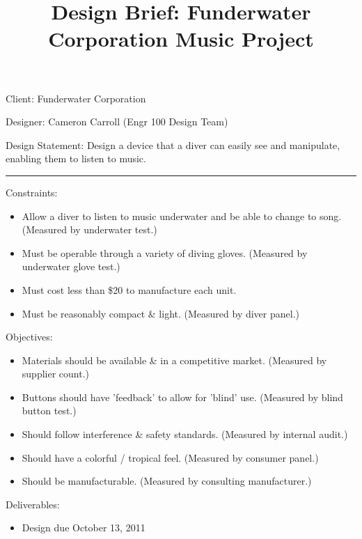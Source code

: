 
\setlength{\topmargin}{-.7in}
\setlength{\leftmargin}{-.7in}
\setlength{\textheight}{9in}
\setlength{\oddsidemargin}{0in}
\setlength{\textwidth}{6.25in}



\title{Design Brief: Funderwater Corporation Music Project}
\maketitle
Client: Funderwater Corporation

Designer: Cameron Carroll (Engr 100 Design Team)

Design Statement: Design a device that a diver can easily see and manipulate, enabling them to listen to music.

\vspace{.2in}
\hrule
\vspace{.2in}

{\large Constraints:}
\begin{itemize}
\item Allow a diver to listen to music underwater and be able to change to song. (Measured by underwater test.)
\item Must be operable through a variety of diving gloves. (Measured by underwater glove test.)
\item Must cost less than \$20 to manufacture each unit. 
\item Must be reasonably compact \& light. (Measured by diver panel.)
\end{itemize}

\vspace{.3in}

{\large Objectives:}
\begin{itemize}
\item Materials should be available \& in a competitive market. (Measured by supplier count.)
\item Buttons should have 'feedback' to allow for 'blind' use. (Measured by blind button test.)
\item Should follow interference \& safety standards. (Measured by internal audit.)
\item Should have a colorful / tropical feel. (Measured by consumer panel.)
\item Should be manufacturable. (Measured by consulting manufacturer.)
\end{itemize}

\vspace{.3in}

{\large Deliverables:}
\begin{itemize}
\item Design due October 13, 2011
\end{itemize}


